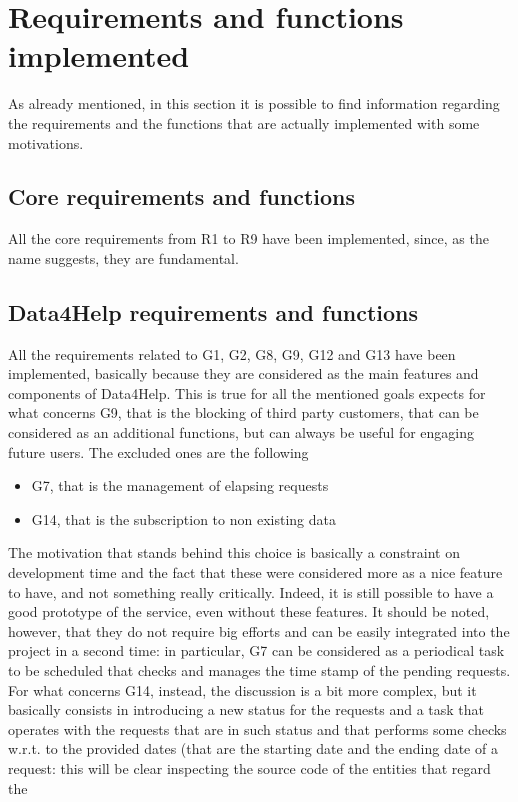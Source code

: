 \section{Requirements and functions implemented}
As already mentioned, in this section it is possible to find information regarding the requirements and the functions that are actually implemented with some motivations.

\subsection{Core requirements and functions}
All the core requirements from R1 to R9 have been implemented, since, as the name suggests, they are fundamental. 

\subsection{Data4Help requirements and functions}
All the requirements related to G1, G2, G8, G9, G12 and G13 have been implemented, basically because they 
are considered as the main features and components of Data4Help. 
This is true for all the mentioned goals expects for what concerns G9, that is the blocking of third party
customers, that can be considered as an additional functions, but can always be useful for engaging future users.
The excluded ones are the following
\begin{itemize}
\item G7, that is the management of elapsing requests 
\item G14, that is the subscription to non existing data
\end{itemize}
The motivation that stands behind this choice is basically a constraint on development time and the
fact that these were considered more as a nice feature to have, and not something really critically. 
Indeed, it is still possible to have a good prototype of the service, even without these features.
It should be noted, however, that they do not require big efforts and can be easily integrated into the
project in a second time: in particular, G7 can be considered as a periodical task to be scheduled that
checks and manages the time stamp of the pending requests. 
For what concerns G14, instead, the discussion is a bit more complex, but it basically consists in introducing a new status for the
requests and a task that operates with the requests that are in such status and that performs some checks w.r.t. to the provided dates 
(that are the starting date and the ending date of a request: this will be clear inspecting the source code of the entities that regard the

